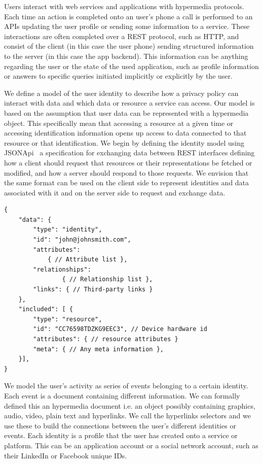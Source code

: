 Users interact with web services and applications with hypermedia protocols. Each time an action is completed onto an user's phone a call is performed to an APIs updating the user profile or sending some information to a service. These interactions are often completed over a REST protocol, such as HTTP, and consist of the client (in this case the user phone) sending structured information to the server (in this case the app backend). This information can be anything regarding the user or the state of the used application, such as profile information or answers to specific queries initiated implicitly or explicitly by the user.

We define a model of the user identity to describe how a privacy policy can interact with data and which data or resource a service can access. Our model is based on the assumption that user data can be represented with a hypermedia object. This specifically mean that accessing a resource at a given time or accessing identification information opens up access to data connected to that resource or that identification. We begin by defining the identity model using JSONApi~\cite{Jsonapi} a specification for exchanging data between REST interfaces defining how a client should request that resources or their representations be fetched or modified, and how a server should respond to those requests. We envision that the same format can be used on the client side to represent identities and data associated with it and on the server side to request and exchange data.

\begin{lstlisting}
{
    "data": {
        "type": "identity",
        "id": "john@johnsmith.com",
        "attributes":
            { // Attribute list },
        "relationships":
                { // Relationship list },
        "links": { // Third-party links }
    },
    "included": [ {
        "type": "resource",
        "id": "CC76598TDZKG9EEC3", // Device hardware id
        "attributes": { // resource attributes }
        "meta": { // Any meta information },
    }],
}
\end{lstlisting}

We model the user's activity as series of events belonging to a certain identity. Each event is a document containing different information. We can formally defined this an hypermedia document i.e. an object possibly containing graphics, audio, video, plain text and hyperlinks. We call the hyperlinks selectors and we use these to build the connections between the user's different identities or events. Each identity is a profile that the user has created onto a service or platform. This can be an application account or a social network account, such as their LinkedIn or Facebook unique IDs.

